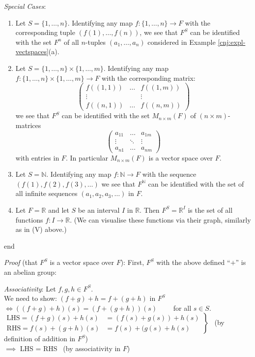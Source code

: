 \documentclass[
  12pt,
  a4paper,
  twoside]{article}
\theoremstyle{plain}
\theoremstyle{definition}
\begin{document}
\emph{Special Cases}:

\begin{enumerate}
\def\labelenumi{(\alph{enumi})}
\item
  Let \(S = \{1,\dots,n\}\). Identifying any map \(f: \{1,\dots,n\} \to F\) with the corresponding tuple \((f(1),\dots,f(n))\), we see that \(F^{S}\) can be identified with the set \(F^{n}\) of all \(n\)-tuples \((a_{1},\dots,a_{n})\) considered in Example \ref{cnj:expl-vectspaces}(a).
\item
  Let \(S = \{1,\dots,n\} \times \{1,\dots,m\}\). Identifying any map \(f: \{1,\dots,n\} \times \{1,\dots,m\} \to F\) with the corresponding matrix: \[ \begin{pmatrix} f((1,1)) & \dots & f((1,m)) \\ \vdots & & \vdots \\ f((n,1)) & \dots & f((n,m)) \end{pmatrix} \] we see that \(F^{S}\) can be identified with the set \(M_{n \times m}(F)\) of \((n \times m)\)-matrices \[ \begin{pmatrix} a_{11} & \dots & a_{1m} \\ \vdots & \ddots & \vdots \\ a_{n1} & \dots & a_{nm} \end{pmatrix} \] with entries in \(F\). In particular \(M_{n \times m}(F)\) is a vector space over \(F\).
\item
  Let \(S = \mathbb{N}\). Identifying any map \(f: \mathbb{N} \to F\) with the sequence \((f(1), f(2), f(3), \dots)\) we see that \(F^{\mathbb{N}}\) can be identified with the set of all infinite sequences \((a_{1},a_{2},a_{3}, \dots)\) in \(F\).
\item
  Let \(F=\mathbb{R}\) and let \(S\) be an interval \(I\) in \(\mathbb{R}\). Then \(F^{S}=\mathbb{R}^I\) is the set of all functions \(f: I \to \mathbb{R}\). (We can visualise these functions via their graph, similarly as in (V) above.)
\end{enumerate}

\csname end

\emph{Proof} (that \(F^S\) is a vector space over \(F\)): First, \(F^S\) with the above defined ``\(+\)'' is an abelian group:

\emph{Associativity}: Let \(f,g,h \in F^{S}\).\\
We need to show: \((f+g)+h = f+(g+h) \text{ in } F^{S}\)\\
\hspace*{0.333em}\hspace*{0.333em}\hspace*{0.333em}\hspace*{0.333em}\hspace*{0.333em}\(\iff ((f+g)+h)(s) = (f+(g+h))(s) \qquad\) for all \(s \in S\).\\
\(\left. \begin{aligned} \text{LHS} = (f+g)(s) + h(s) & = (f(s) + g(s)) + h(s) \\  \text{RHS} = f(s) + (g+h)(s) & = f(s) +(g(s) + h(s) \end{aligned} \right\}\) \hfill~{(by definition of addition in \(F^{S}\))}\\
\(\implies\) LHS = RHS \hfill~{(by associativity in \(F\))}
\end{document}
